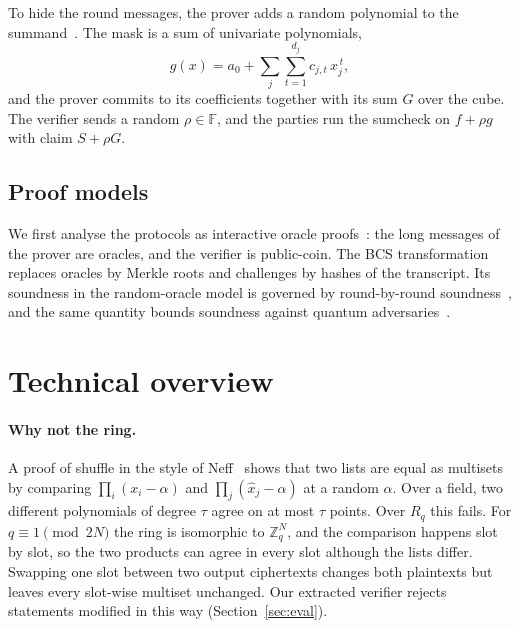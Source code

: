 \documentclass[sigconf,anonymous]{acmart}
\newcommand{\Zq}{\mathbb{Z}_q}
\newcommand{\Rq}{R_q}
\newcommand{\F}{\mathbb{F}}
\begin{document}
To hide the round messages, the prover adds a random polynomial to the
summand~\cite{CFS17,Libra}. The mask is a sum of univariate polynomials,
\[
  g(x)=a_0+\sum_{j}\sum_{t=1}^{d_j}c_{j,t}\,x_j^{\,t},
\]
and the prover commits to its coefficients together with its sum $G$ over the cube. The verifier
sends a random $\rho\in\F$, and the parties run the sumcheck on $f+\rho g$ with claim $S+\rho G$.

\subsection{Proof models}

We first analyse the protocols as interactive oracle proofs~\cite{BCS16}: the long messages of the
prover are oracles, and the verifier is public-coin. The BCS transformation~\cite{BCS16} replaces
oracles by Merkle roots and challenges by hashes of the transcript. Its soundness in the
random-oracle model is governed by round-by-round soundness~\cite{Hol19}, and the same quantity
bounds soundness against quantum adversaries~\cite{CMS19}.

\section{Technical overview}
\label{sec:overview}

\paragraph{Why not the ring.}
A proof of shuffle in the style of Neff~\cite{Neff01} shows that two lists are equal as multisets by
comparing $\prod_i(x_i-\alpha)$ and $\prod_j(\hat{x}_j-\alpha)$ at a random $\alpha$. Over a field,
two different polynomials of degree $\tau$ agree on at most $\tau$ points. Over $\Rq$ this fails.
For $q\equiv 1\pmod{2N}$ the ring is isomorphic to $\Zq^N$, and the comparison happens slot by slot,
so the two products can agree in every slot although the lists differ. Swapping one slot between
two output ciphertexts changes both plaintexts but leaves every slot-wise multiset unchanged. Our
extracted verifier rejects statements modified in this way (Section~\ref{sec:eval}).
\end{document}
